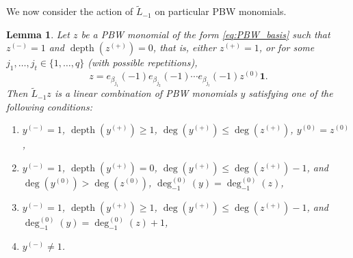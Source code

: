 \documentclass[11pt]{article}
\numberwithin{equation}{section}
\let\be\beta
\DeclareMathOperator{\dep}{depth}
\newtheorem{lem}[theorem]{Lemma}
\theoremstyle{definition}
\begin{document}
We now consider the action of $\tilde{L}_{-1}$ on particular PBW monomials.
\begin{lem}
\label{lem:Sugawara_bracket}
Let $z$ be a PBW monomial of the form \eqref{eq:PBW_basis}
such that $z^{(-)}=1$ and $\dep(z^{(+)})=0$, that is,
either $z^{(+)}=1$, or for some $j_1,\dots,j_t \in \{1,\dots,q\}$
(with possible repetitions),\vspace*{-3pt}
\begin{equation*}
z = e_{\be_{j_1}}(-1)e_{\be_{j_2}}(-1)\cdots e_{\be_{j_t}}(-1) z ^{(0)} \mathbf{1}.
\end{equation*}
Then $\tilde{L}_{-1}z$
is a linear combination of PBW monomials $y$ satisfying one of the following
conditions:
\begin{enumerate}
\item\label{lem:Sugawara_bracket1}
$\!y^{(-)}=1$, $\dep(y^{(+)})\geq 1$, $\deg(y^{(+)})\leq \deg(z^{(+)})$,
$y^{(0)}=z^{(0)}$,
\item\label{lem:Sugawara_bracket2}
$\!y^{(-)}\!=\!1$, $\dep(y^{(+)})\!=\!0$, $\deg (y^{(+)})\!\leq\! \deg (z^{(+)})-1$, and
$\deg(y^{(0)})\!>\!\deg(z^{(0)})$, $\deg_{-1}^{(0)}(y)=\deg_{-1}^{(0)}(z)$,
\item\label{lem:Sugawara_bracket3}
$\!y^{(-)}\!=\!1$, $\dep(y^{(+)})\!\geq\!1$, $\deg(y^{(+)})\!\leq\!\deg(z^{(+)})-1$, and \hbox{$\deg_{-1}^{(0)}(y)\!=\!\deg_{-1}^{(0)}(z)\!+\!1$},
\item\label{lem:Sugawara_bracket4}
$\!y^{(-)}\neq 1$.
\end{enumerate}
\end{lem}
\end{document}
